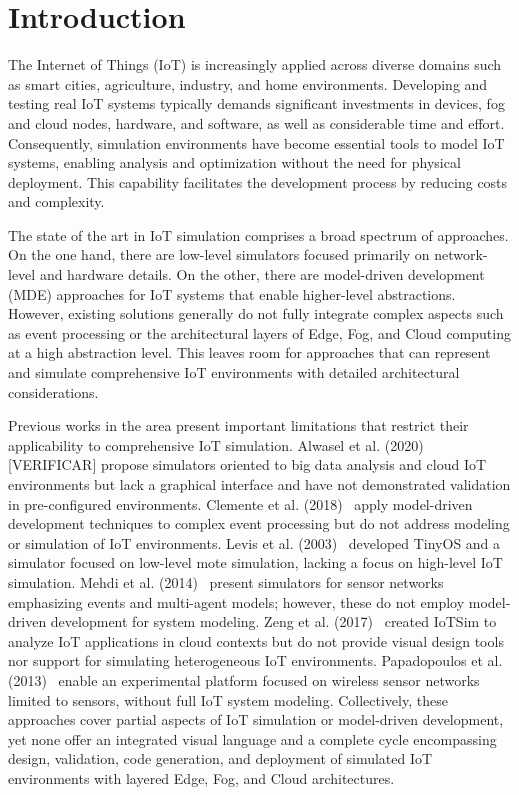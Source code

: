 \documentclass[journal]{IEEEtran}
\begin{document}
\IEEEpeerreviewmaketitle


\section{Introduction}









The Internet of Things (IoT) is increasingly applied across diverse domains such as smart cities, agriculture, industry, and home environments. Developing and testing real IoT systems typically demands significant investments in devices, fog and cloud nodes, hardware, and software, as well as considerable time and effort. Consequently, simulation environments have become essential tools to model IoT systems, enabling analysis and optimization without the need for physical deployment. This capability facilitates the development process by reducing costs and complexity.

The state of the art in IoT simulation comprises a broad spectrum of approaches. On the one hand, there are low-level simulators focused primarily on network-level and hardware details. On the other, there are model-driven development (MDE) approaches for IoT systems that enable higher-level abstractions. However, existing solutions generally do not fully integrate complex aspects such as event processing or the architectural layers of Edge, Fog, and Cloud computing at a high abstraction level. This leaves room for approaches that can represent and simulate comprehensive IoT environments with detailed architectural considerations.

Previous works in the area present important limitations that restrict their applicability to comprehensive IoT simulation. Alwasel et al. (2020) [VERIFICAR] propose simulators oriented to big data analysis and cloud IoT environments but lack a graphical interface and have not demonstrated validation in pre-configured environments. Clemente et al. (2018)~\cite{Clemente_2018} apply model-driven development techniques to complex event processing but do not address modeling or simulation of IoT environments. Levis et al. (2003)~\cite{levis2003tossim} developed TinyOS and a simulator focused on low-level mote simulation, lacking a focus on high-level IoT simulation. Mehdi et al. (2014)~\cite{mehdi2014cupcarbon} present simulators for sensor networks emphasizing events and multi-agent models; however, these do not employ model-driven development for system modeling. Zeng et al. (2017)~\cite{Zeng_2017} created IoTSim to analyze IoT applications in cloud contexts but do not provide visual design tools nor support for simulating heterogeneous IoT environments. Papadopoulos et al. (2013)~\cite{papadopoulos2013iotl} enable an experimental platform focused on wireless sensor networks limited to sensors, without full IoT system modeling. Collectively, these approaches cover partial aspects of IoT simulation or model-driven development, yet none offer an integrated visual language and a complete cycle encompassing design, validation, code generation, and deployment of simulated IoT environments with layered Edge, Fog, and Cloud architectures.
\end{document}
